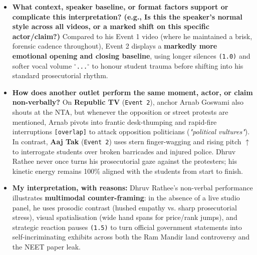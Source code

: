 \documentclass[10pt,a4paper]{article}
\begin{document}
\begin{itemize}
The non-verbal cues \textbf{dramatise and reinforce} the documentary evidence (pointing at FIRs and scorecards), \textbf{invert official assurances via sarcasm} (the \texttt{[scoff]} and circular finger gesture on NTA's inquiry committee at \texttt{[08:42]}), and \textbf{leave the accusation of top-down political orchestration unspoken via trailing off} (\texttt{...}) when discussing the \texttt{4 June} election-day release (\texttt{[05:52]}) and the Gujarat/Bihar exam mafia nexus (\texttt{[14:50]}).\par\smallskip
  \item \textbf{What context, speaker baseline, or format factors support or complicate this interpretation? (e.g., Is this the speaker's normal style across all videos, or a marked shift on this specific actor/claim?)}
Compared to his Event 1 video (where he maintained a brisk, forensic cadence throughout), Event 2 displays a \textbf{markedly more emotional opening and closing baseline}, using longer silences \texttt{(1.0)} and softer vocal volume \texttt{$^\circ$...$^\circ$} to honour student trauma before shifting into his standard prosecutorial rhythm.\par\smallskip
  \item \textbf{How does another outlet perform the same moment, actor, or claim non-verbally?}
On \textbf{Republic TV} (\texttt{Event 2}), anchor Arnab Goswami also shouts at the NTA, but whenever the opposition or street protests are mentioned, Arnab pivots into frantic desk-thumping and rapid-fire interruptions \texttt{[overlap]} to attack opposition politicians (\textit{"political vultures"}). In contrast, \textbf{Aaj Tak} (\texttt{Event 2}) uses stern finger-wagging and rising pitch \texttt{$\uparrow$} to interrogate students over broken barricades and injured police. Dhruv Rathee never once turns his prosecutorial gaze against the protesters; his kinetic energy remains 100\% aligned with the students from start to finish.\par\smallskip
  \item \textbf{My interpretation, with reasons:}
Dhruv Rathee's non-verbal performance illustrates \textbf{multimodal counter-framing}: in the absence of a live studio panel, he uses prosodic contrast (hushed empathy vs. sharp prosecutorial stress), visual spatialisation (wide hand spans for price/rank jumps), and strategic reaction pauses \texttt{(1.5)} to turn official government statements into self-incriminating exhibits across both the Ram Mandir land controversy and the NEET paper leak.\par\smallskip
\end{itemize}
\end{document}
